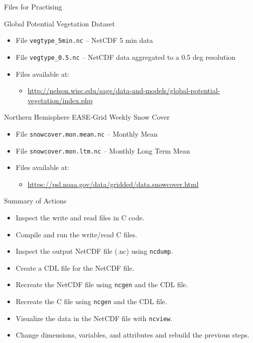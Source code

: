\documentclass[compress,11pt,xcolor=svgnames,aspectratio=169]{beamer}
\begin{document}
\begin{frame}[fragile]{Files for Practising}

Global Potential Vegetation Dataset

    \begin{itemize}
    \setlength\itemsep{0.2cm}
      \item File \verb|vegtype_5min.nc| -- NetCDF 5 min data
      \item File \verb|vegtype_0.5.nc| -- NetCDF data aggregated to a 0.5 deg resolution
      \item Files available at:
        \begin{itemize}
          \item {\scriptsize \url{http://nelson.wisc.edu/sage/data-and-models/global-potential-vegetation/index.php}}
        \end{itemize}
    \end{itemize}

\vspace*{0.3cm}

Northern Hemisphere EASE-Grid Weekly Snow Cover

    \begin{itemize}
    \setlength\itemsep{0.2cm}
      \item File \verb|snowcover.mon.mean.nc| -- Monthly Mean
      \item File \verb|snowcover.mon.ltm.nc|	-- Monthly Long Term Mean
      \item Files available at:
        \begin{itemize}
          \item {\scriptsize \url{https://psl.noaa.gov/data/gridded/data.snowcover.html}}
        \end{itemize}
    \end{itemize}

\end{frame}

\begin{frame}[fragile]{Summary of Actions}

\begin{itemize}
\setlength\itemsep{0.3cm}

  \item Inspect the write and read files in C code.
  \item Compile and run the write/read C files.
  \item Inspect the output NetCDF file (.nc) using \texttt{ncdump}.
  \item Create a CDL file for the NetCDF file.
  \item Recreate the NetCDF file using \texttt{ncgen} and the CDL file.
  \item Recreate the C file using \texttt{ncgen} and the CDL file.
  \item Visualize the data in the NetCDF file with \texttt{ncview}.
  \item Change dimensions, variables, and attributes and rebuild the previous steps.

\end{itemize}

\end{frame}
\end{document}
